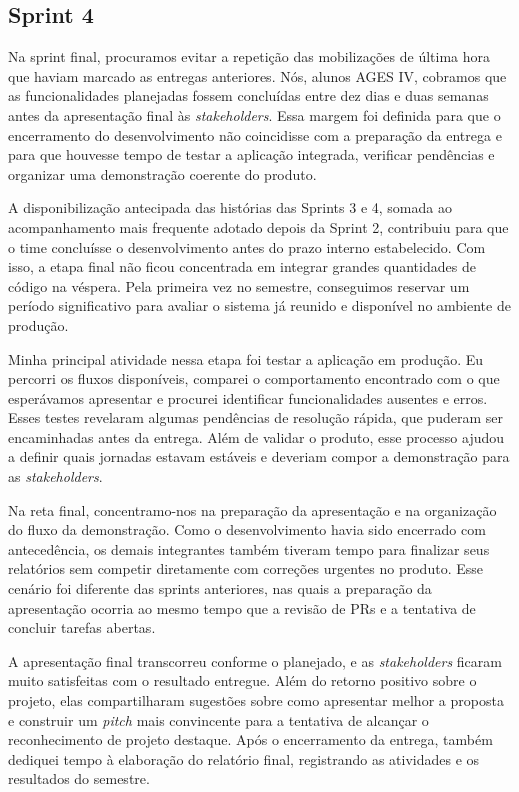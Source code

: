 \subsection{Sprint 4}

Na sprint final, procuramos evitar a repetição das mobilizações de última hora
que haviam marcado as entregas anteriores. Nós, alunos AGES IV, cobramos que as
funcionalidades planejadas fossem concluídas entre dez dias e duas semanas antes
da apresentação final às \textit{stakeholders}. Essa margem foi definida para que
o encerramento do desenvolvimento não coincidisse com a preparação da entrega e
para que houvesse tempo de testar a aplicação integrada, verificar pendências e
organizar uma demonstração coerente do produto.

A disponibilização antecipada das histórias das Sprints 3 e 4, somada ao
acompanhamento mais frequente adotado depois da Sprint 2, contribuiu para que o
time concluísse o desenvolvimento antes do prazo interno estabelecido. Com isso,
a etapa final não ficou concentrada em integrar grandes quantidades de código na
véspera. Pela primeira vez no semestre, conseguimos reservar um período
significativo para avaliar o sistema já reunido e disponível no ambiente de
produção.

Minha principal atividade nessa etapa foi testar a aplicação em produção. Eu
percorri os fluxos disponíveis, comparei o comportamento encontrado com o que
esperávamos apresentar e procurei identificar funcionalidades ausentes e erros.
Esses testes revelaram algumas pendências de resolução rápida, que puderam ser
encaminhadas antes da entrega. Além de validar o produto, esse processo ajudou a
definir quais jornadas estavam estáveis e deveriam compor a demonstração para as
\textit{stakeholders}.

Na reta final, concentramo-nos na preparação da apresentação e na organização do
fluxo da demonstração. Como o desenvolvimento havia sido encerrado com
antecedência, os demais integrantes também tiveram tempo para finalizar seus
relatórios sem competir diretamente com correções urgentes no produto. Esse
cenário foi diferente das sprints anteriores, nas quais a preparação da
apresentação ocorria ao mesmo tempo que a revisão de PRs e a tentativa de concluir
tarefas abertas.

A apresentação final transcorreu conforme o planejado, e as \textit{stakeholders}
ficaram muito satisfeitas com o resultado entregue. Além do retorno positivo
sobre o projeto, elas compartilharam sugestões sobre como apresentar melhor a
proposta e construir um \textit{pitch} mais convincente para a tentativa de
alcançar o reconhecimento de projeto destaque. Após o encerramento da entrega,
também dediquei tempo à elaboração do relatório final, registrando as atividades
e os resultados do semestre.


